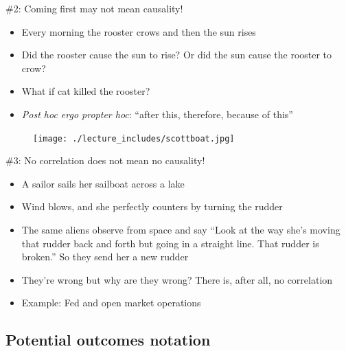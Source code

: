 \documentclass{beamer}
\begin{document}
\begin{frame}{\#2: Coming first may not mean causality!}

  \begin{itemize}
    \item Every morning the rooster crows and then the sun rises
    \item Did the rooster cause the sun to rise? Or did the sun cause the rooster to crow?
    \item What if cat killed the rooster?
    \item \emph{Post hoc ergo propter hoc}: ``after this, therefore, because of this''
  \end{itemize}

\end{frame}

\begin{frame}[plain]

  \begin{figure}
    \centering
    \texttt{[image: ./lecture\_includes/scottboat.jpg]}
  \end{figure}

\end{frame}

\begin{frame}{\#3: No correlation does not mean no causality!}

  \begin{itemize}
    \item A sailor sails her sailboat across a lake
    \item Wind blows, and she perfectly counters by turning the rudder
    \item The same aliens observe from space and say ``Look at the way she's moving that rudder back and forth but going in a straight line.  That rudder is broken.'' So they send her a new rudder
    \item They're wrong but why are they wrong? There is, after all, no correlation
    \item Example: Fed and open market operations
  \end{itemize}

\end{frame}

\subsection{Potential outcomes notation}
\end{document}
